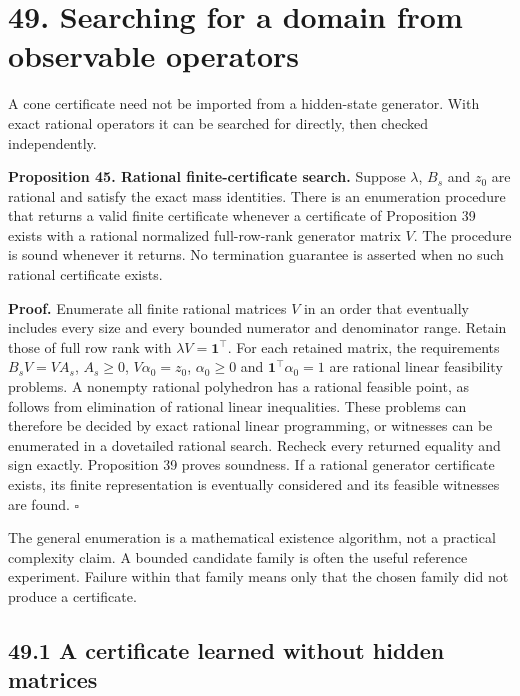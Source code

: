 \documentclass[11pt,letterpaper]{article}
\begin{document}
\section{49. Searching for a domain from observable
operators}\label{searching-for-a-domain-from-observable-operators}

A cone certificate need not be imported from a hidden-state generator.
With exact rational operators it can be searched for directly, then
checked independently.

\textbf{Proposition 45. Rational finite-certificate search.} Suppose
\(\lambda\), \(B_s\) and \(z_0\) are rational and satisfy the exact mass
identities. There is an enumeration procedure that returns a valid
finite certificate whenever a certificate of Proposition 39 exists with
a rational normalized full-row-rank generator matrix \(V\). The
procedure is sound whenever it returns. No termination guarantee is
asserted when no such rational certificate exists.

\textbf{Proof.} Enumerate all finite rational matrices \(V\) in an order
that eventually includes every size and every bounded numerator and
denominator range. Retain those of full row rank with
\(\lambda V=\mathbf1^\top\). For each retained matrix, the requirements
\(B_sV=VA_s\), \(A_s\geq0\), \(V\alpha_0=z_0\), \(\alpha_0\geq0\) and
\(\mathbf1^\top\alpha_0=1\) are rational linear feasibility problems. A
nonempty rational polyhedron has a rational feasible point, as follows
from elimination of rational linear inequalities. These problems can
therefore be decided by exact rational linear programming, or witnesses
can be enumerated in a dovetailed rational search. Recheck every
returned equality and sign exactly. Proposition 39 proves soundness. If
a rational generator certificate exists, its finite representation is
eventually considered and its feasible witnesses are found. \(\square\)

The general enumeration is a mathematical existence algorithm, not a
practical complexity claim. A bounded candidate family is often the
useful reference experiment. Failure within that family means only that
the chosen family did not produce a certificate.

\subsection{49.1 A certificate learned without hidden
matrices}\label{a-certificate-learned-without-hidden-matrices}
\end{document}
